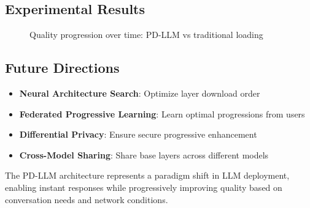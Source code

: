 \subsection{Experimental Results}

\begin{figure}[h]
\centering
{}
\caption{Quality progression over time: PD-LLM vs traditional loading}
\end{figure}

\subsection{Future Directions}

\begin{itemize}
    \item \textbf{Neural Architecture Search}: Optimize layer download order
    \item \textbf{Federated Progressive Learning}: Learn optimal progressions from users
    \item \textbf{Differential Privacy}: Ensure secure progressive enhancement
    \item \textbf{Cross-Model Sharing}: Share base layers across different models
\end{itemize}

The PD-LLM architecture represents a paradigm shift in LLM deployment, enabling instant responses while progressively improving quality based on conversation needs and network conditions.